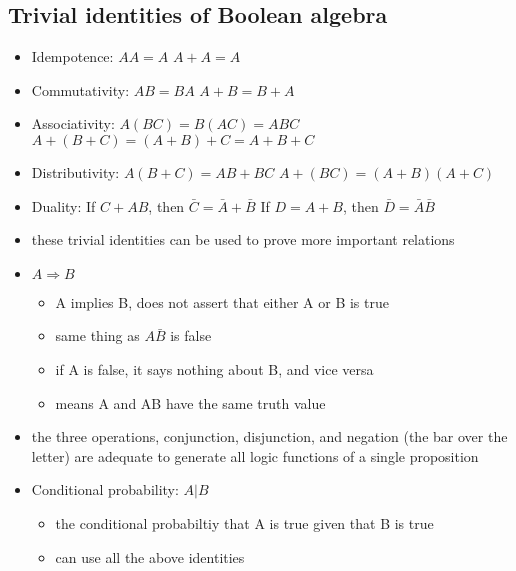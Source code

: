 \documentclass[../jaynes_prob_theory_notes.tex]{subfiles}
\begin{document}
    \subsection{Trivial identities of Boolean algebra}
    \begin{itemize}
        \item[] Idempotence:  
        $AA = A$
        $A + A = A$
    
        \item[] Commutativity:
            $AB = BA$
            $A + B = B + A$
        
        \item[] Associativity:
            $A(BC) = B(AC) = ABC$
            $A + (B + C) = (A + B) + C = A + B + C$
        
        \item[] Distributivity:
            $A(B+C) = AB + BC$
            $A + (BC) = (A + B)(A + C)$
        
        \item[] Duality:
            If $C + AB$, then $\bar{C} = \bar{A} + \bar{B}$
            If $D = A + B$, then $\bar{D} = \bar{A}\bar{B}$
          
        \item these trivial identities can be used to prove more important relations
        \item $A \Rightarrow B$
            \begin{itemize}
                \item A implies B, does not assert that either A or B is true
                \item same thing as $A\bar{B}$ is false
                \item if A is false, it says nothing about B, and vice versa
                \item means A and AB have the same truth value
            \end{itemize}
        \item the three operations, conjunction, disjunction, and negation (the bar over the letter) are adequate to generate all logic functions of a single proposition
    \end{itemize}

    \begin{itemize}
        \item Conditional probability: $A|B$
            \begin{itemize}
                \item the conditional probabiltiy that A is true given that B is true
                \item can use all the above identities
            \end{itemize}
    \end{itemize}
\end{document}
